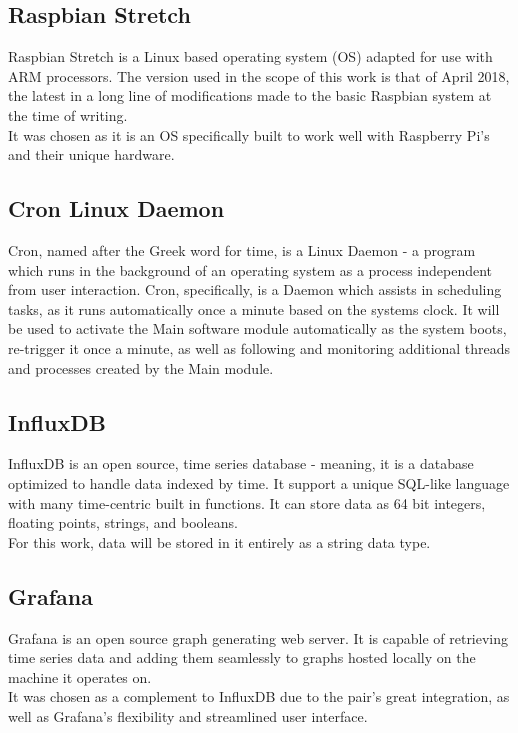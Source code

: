 \documentclass[twoside]{ctuthesis}
\theoremstyle{plain}
\theoremstyle{definition}
\theoremstyle{note}
\begin{document}
\subsection{Raspbian Stretch}
Raspbian Stretch is a Linux based operating system (OS) adapted for use with ARM processors. The version used in the scope of this work is that of April 2018, the latest in a long line of modifications made to the basic Raspbian system at the time of writing.\\
It was chosen as it is an OS specifically built to work well with Raspberry Pi's and their unique hardware.

\subsection{Cron Linux Daemon}
Cron, named after the Greek word for time, is a Linux Daemon - a program which runs in the background of an operating system as a process independent from user interaction. Cron, specifically, is a Daemon which assists in scheduling tasks, as it runs automatically once a minute based on the systems clock. It will be used to activate the Main software module automatically as the system boots, re-trigger it once a minute, as well as following and monitoring additional threads and processes created by the Main module.

\subsection{InfluxDB}
InfluxDB is an open source, time series database - meaning, it is a database optimized to handle data indexed by time. It support a unique SQL-like language with many time-centric built in functions. It can store data as 64 bit integers, floating points, strings, and booleans.\\
For this work, data will be stored in it entirely as a string data type.

\subsection{Grafana}
Grafana is an open source graph generating web server. It is capable of retrieving time series data and adding them seamlessly to graphs hosted locally on the machine it operates on.\\
It was chosen as a complement to InfluxDB due to the pair's great integration, as well as Grafana's flexibility and streamlined user interface.
\end{document}
